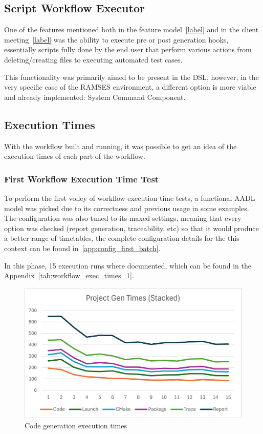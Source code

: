 \subsection{Script Workflow Executor}
\label{sec:workflows_script_executor}

One of the features mentioned both in the feature model~\ref{label} and in the client meeting~\ref{label} was the ability to execute pre or post generation hooks, essentially scripts fully done by the end user that perform various actions from deleting/creating files to executing automated test cases. 

This functionality was primarily aimed to be present in the \gls{DSL}, however, in the very specific case of the \gls{RAMSES} environment, a different option is more viable and already implemented: System Command Component.


\subsection{Execution Times}
\label{sec:exec_times}

With the workflow built and running, it was possible to get an idea of the execution times of each part of the workflow.

\subsubsection{First Workflow Execution Time Test}
\label{sec:exec_times_v1}

To perform the first volley of workflow execution time tests, a functional \gls{AADL} model was picked due to its correctness and previous usage in some examples. The configuration was also tuned to its maxed settings, meaning that every option was checked (report generation, traceability, etc) so that it would produce a better range of timetables, the complete configuration details for the this context can be found in~\ref{app:config_first_batch}.

In this phase, 15 execution runs where documented, which can be found in the Appendix~\ref{tab:workflow_exec_times_1}.

\begin{figure}[htbp]
	\centering
	\includegraphics[width=\textwidth]{exec_times1.png}
	\caption{Code generation execution times}
	\label{fig:exec_times_1}
\end{figure}

